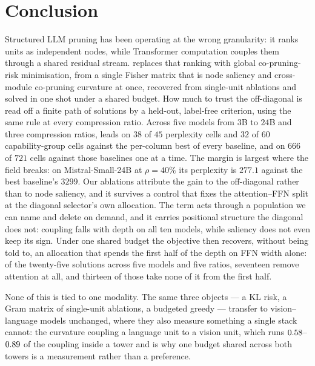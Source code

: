 \section{Conclusion}
\label{sec:conclusion}

Structured LLM pruning has been operating at the wrong granularity: it ranks units as independent
nodes, while Transformer computation couples them through a shared residual stream. \methodfull
replaces that ranking with global co-pruning-risk minimisation, from a single Fisher matrix that is
node saliency and cross-module co-pruning curvature at once, recovered from single-unit ablations and
solved in one shot under a shared budget. How much to trust the off-diagonal is read off a finite path of solutions by a held-out, label-free
criterion, using the same rule at every compression ratio.
Across five models from $3$B to $24$B and three compression ratios, \method leads on
$38$ of $45$ perplexity cells and $32$ of $60$ capability-group cells against the
per-column best of every baseline, and on $666$ of $721$ cells against those baselines one at
a time.
The margin is largest where the field breaks: on Mistral-Small-24B at $\rho{=}40\%$ its perplexity is
$277.1$ against the best baseline's $3299$.
Our ablations attribute the gain to the off-diagonal rather than to node saliency, and it survives a
control that fixes the attention--FFN split at the diagonal selector's own allocation. The term acts
through a population we can name and delete on demand, and it carries positional structure the
diagonal does not: coupling falls with depth on all ten models, while saliency does not
even keep its sign. Under one shared budget the objective then recovers, without being told to, an
allocation that spends the first half of the depth on FFN width alone: of the twenty-five solutions
across five models and five ratios, seventeen remove attention at all, and thirteen of those
take none of it from the first half.

None of this is tied to one modality. The same three objects --- a KL risk, a Gram matrix of
single-unit ablations, a budgeted greedy --- transfer to vision--language models unchanged, where they
also measure something a single stack cannot: the curvature coupling a language unit to a vision unit,
which runs $0.58$--$0.89$ of the coupling inside a tower and is why one budget shared
across both towers is a measurement rather than a preference.

